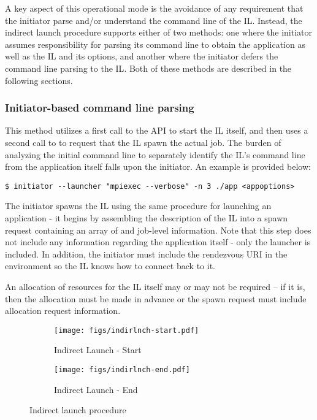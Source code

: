 A key aspect of this operational mode is the avoidance of any requirement that the initiator parse and/or understand the command line of the \ac{IL}. Instead, the indirect launch procedure supports either of two methods: one where the initiator assumes responsibility for parsing its command line to obtain the application as well as the \ac{IL} and its options, and another where the initiator defers the command line parsing to the \ac{IL}. Both of these methods are described in the following sections.

\subsubsection{Initiator-based command line parsing}
\label{chap:api_tools:indirect:tool}

This method utilizes a first call to the  \ac{API} to start the \ac{IL} itself, and then uses a second call to  to request that the \ac{IL} spawn the actual job. The burden of analyzing the initial command line to separately identify the \ac{IL}'s command line from the application itself falls upon the initiator. An example is provided below:

\begin{verbatim}
$ initiator --launcher "mpiexec --verbose" -n 3 ./app <appoptions>
\end{verbatim}

The initiator spawns the \ac{IL} using the same procedure for launching an application - it begins by assembling the description of the \ac{IL} into a spawn request containing an array of  and  job-level information. Note that this step does not include any information regarding the application itself - only the launcher is included. In addition, the initiator must include the rendezvous \ac{URI} in the environment so the \ac{IL} knows how to connect back to it.

An allocation of resources for the \ac{IL} itself may or may not be required – if it is, then the allocation must be made in advance or the spawn request must include allocation request information.

\begin{figure*}[ht!]
\centering
\begin{subfigure}{.5\textwidth}
  \centering
  \texttt{[image: figs/indirlnch-start.pdf]}
  \caption{Indirect Launch - Start}
  \label{fig:indirlnch-start}
\end{subfigure}%
\begin{subfigure}{.5\textwidth}
  \centering
  \texttt{[image: figs/indirlnch-end.pdf]}
  \caption{Indirect Launch - End}
  \label{fig:indirlnch-end}
\end{subfigure}
\caption{Indirect launch procedure}
\label{fig:indirlnch}
\end{figure*}


